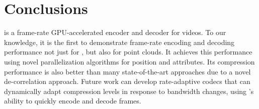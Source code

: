\section{Conclusions}\label{sec:conclusions}

\gsnfs{} is a frame-rate GPU-accelerated encoder and decoder for \dgs{} videos.
%
To our knowledge, it is the first to demonstrate frame-rate encoding and decoding performance not just for \dgs{}, but also for point clouds.
%
It achieves this performance using novel parallelization algorithms for position and attributes.
%
Its compression performance is also better than many state-of-the-art approaches due to a novel de-correlation approach.
%
Future work can develop rate-adaptive codecs that can dynamically adapt compression levels in response to bandwidth changes, using \gsnfs{}'s ability to quickly encode and decode frames.
